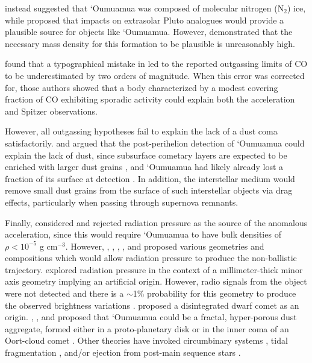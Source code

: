 \documentclass[twocolumn,doublespacing]{aastex631}
\begin{document}
\citet{jackson2021} instead suggested that `Oumuamua was composed of molecular nitrogen (N$_2$) ice, while \citet{desch2021} proposed that impacts on extrasolar Pluto analogues would provide a plausible source for objects like `Oumuamua. However, \citet{levine2021} demonstrated that the necessary mass density for this formation to be plausible is unreasonably high.

\citet{seligman2021} found that a typographical mistake in \citet{trilling2018} led to the reported outgassing limits of CO to be underestimated by two orders of magnitude. When this error was corrected for, those authors showed that a body characterized by a modest covering fraction of CO exhibiting sporadic activity could explain both the acceleration and Spitzer observations. 

However, all outgassing hypotheses fail to explain the lack of a dust coma satisfactorily. \citet{micheli2018} and \citet{seligman2021} argued that the post-perihelion detection of `Oumuamua could explain the lack of dust, since subsurface cometary layers are expected to be enriched with larger dust grains \citep{laufer2005,micheli2018}, and `Oumuamua had likely already lost a fraction of its surface at detection \citep{SLB2019,SL2020,desch2021,jackson2021}. In addition, the interstellar medium would remove small dust grains from the surface of such interstellar objects \citep{stern1987,stern1990} via drag effects, particularly when passing through supernova remnants.

Finally, \citet{micheli2018} considered and rejected radiation pressure as the source of the anomalous acceleration, since this would require `Oumuamua to have bulk densities of $\rho<10^{-5}$ g cm$^{-3}$. However, \citet{bialyloeb2018}, \citet{moro-martin2019}, \citet{flekkoy2019}, \citet{luu2020}, and \citet{sekaninacomet} proposed various geometries and compositions which would allow radiation pressure to produce the non-ballistic trajectory. \citet{bialyloeb2018} explored radiation pressure in the context of a millimeter-thick minor axis geometry implying an artificial origin. However, radio signals from the object were not detected \citep{Enriquez2018,Tingay2018,Harp2019} and there is a $\sim$1\% probability for this geometry to produce the observed brightness variations \citep{Zhou2022}. \citet{sekaninacomet} proposed a disintegrated dwarf comet as an origin. \citet{moro-martin2019}, \citet{flekkoy2019}, and \citet{luu2020} proposed that `Oumuamua could be a fractal, hyper-porous dust aggregate, formed either in a proto-planetary disk \citep{moro-martin2019} or in the inner coma of an Oort-cloud comet \citep{flekkoy2019,luu2020}. Other theories have invoked circumbinary systems \citep{Cuk2017,Jackson2017,Childs2022}, tidal fragmentation \citep{Raymond2018b,zhang2020tidal,Raymond2020}, and/or ejection from post-main sequence stars \citep{Hansen2017,Rafikov2018c,Katz2018}. 
\end{document}
